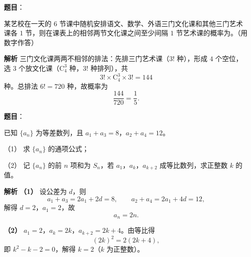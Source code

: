 \begin{answer}

\textbf{题目}：

某艺校在一天的 $6$ 节课中随机安排语文、数学、外语三门文化课和其他三门艺术课各 $1$ 节，则在课表上的相邻两节文化课之间至少间隔 $1$ 节艺术课的概率为\gkblank{}。（用数字作答）

\textbf{解析}
三门文化课两两不相邻的排法：先排三门艺术课（$3!$ 种），形成 $4$ 个空位，选 $3$ 个放文化课（$\mathrm C_4^3$ 种，$3!$ 种排列），共
\nopagebreak[4]
\[3!\times\mathrm C_4^3\times3!=144\]
种。总排法 $6!=720$ 种，故概率为
\nopagebreak[4]
\[\frac{144}{720}=\frac15.\]


\end{answer}
\begin{answer}

\textbf{题目}：

已知 $\{a_n\}$ 为等差数列，且 $a_1+a_3=8$，$a_2+a_4=12$。

（1） 求 $\{a_n\}$ 的通项公式；

（2） 记 $\{a_n\}$ 的前 $n$ 项和为 $S_n$，若 $a_1$，$a_k$，$a_{k+2}$ 成等比数列，求正整数 $k$ 的值。

\textbf{解析}
\textbf{（1）} 设公差为 $d$，则
\nopagebreak[4]
\[a_1+a_3=2a_1+2d=8,\qquad a_2+a_4=2a_1+4d=12,\]
解得 $d=2$，$a_1=2$，故
\nopagebreak[4]
\[a_n=2n.\]

\textbf{（2）} $a_1=2$，$a_k=2k$，$a_{k+2}=2k+4$。由等比得
\nopagebreak[4]
\[(2k)^2=2(2k+4),\]
即 $k^2-k-2=0$，解得 $k=2$（$k$ 为正整数）。



\end{answer}
